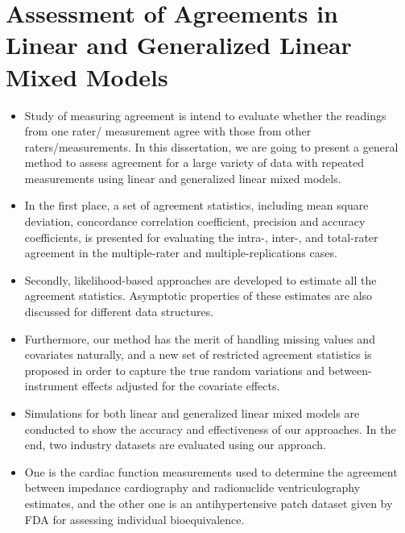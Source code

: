 \section{Assessment of Agreements in Linear and Generalized Linear Mixed Models}

\begin{itemize}
\item Study of measuring agreement is intend to evaluate whether the readings from one rater/ measurement 
agree with those from other raters/measurements. 
In this dissertation, we are going to present a general method to assess agreement for a large 
variety of data with repeated measurements using linear and generalized linear mixed models. 
\item In the first place, a set of agreement statistics, including mean square deviation, concordance 
correlation coefficient, precision and accuracy coefficients, is presented for evaluating the 
intra-, inter-, and total-rater agreement in the multiple-rater and multiple-replications cases. 
\item Secondly, likelihood-based approaches are developed to estimate all the agreement statistics. 
Asymptotic properties of these estimates are also discussed for different data structures. 
\item Furthermore, our method has the merit of handling missing values and covariates naturally, 
and a new set of restricted agreement statistics is proposed in order to capture the true random 
variations and between-instrument effects adjusted for the covariate effects. 

\item Simulations for both linear and generalized linear mixed models are conducted to show the accuracy and effectiveness 
of our approaches. In the end, two industry datasets are evaluated using our approach. 
\item One is the cardiac function measurements used to determine the agreement between impedance cardiography and radionuclide 
ventriculography estimates, and the other one is an antihypertensive patch dataset given by FDA for assessing 
individual bioequivalence.
\end{itemize}